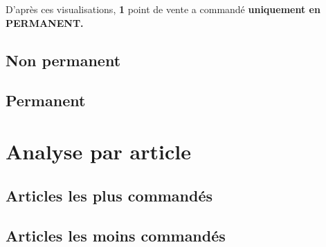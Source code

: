 \documentclass{beamer}
\begin{document}
\begin{frame}
        D’après ces visualisations, \textbf{1}
        point de vente a commandé
        \textbf{uniquement en PERMANENT.}
    \end{frame}

    \subsection{Non permanent}

    \begin{frame}
    \end{frame}

    \subsection{Permanent}

    \begin{frame}
    \end{frame}

    \section{Analyse par article}
    \subsection{Articles les plus commandés}

    \begin{frame}
    \end{frame}

    \subsection{Articles les moins commandés}

    \begin{frame}
    \end{frame}
\end{document}
